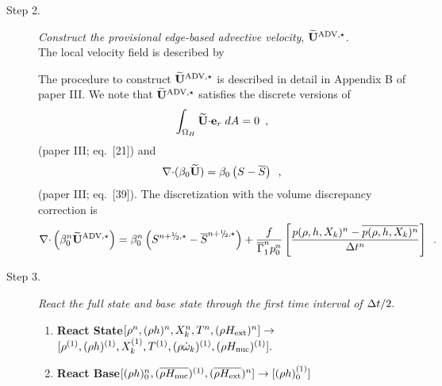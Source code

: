 \begin{description}
\item[Step 2.] {\em Construct the provisional edge-based advective velocity}, $\widetilde{\mathbf{U}}^{\mathrm{ADV},\star}$.\\

The local velocity field is described by

The procedure to construct $\widetilde{\mathbf{U}}^{\mathrm{ADV},\star}$ is described in detail in Appendix B of paper III.
We note that  $\widetilde{\mathbf{U}}^{\mathrm{ADV},\star}$ satisfies the discrete versions of 
\begin{equation}
\int_{\Omega_H} \widetilde{{\bf U}} \mathbf{\cdot} \mathbf{e}_r \; dA = 0 \label{eq:udoterzero} \enskip ,
\end{equation}
(paper III; eq.~[21])
and
\begin{equation}
\mathbf{\nabla} \mathbf{\cdot} (\beta_0 \widetilde{{\bf U}} )  = \beta_0 \left(S - \overline{S} \right )\enskip ,
\label{eq:tildeconstraint}
\end{equation}
(paper III; eq.~[39]).  The discretization with the volume discrepancy correction is
\begin{equation}
\nablab \cdotb \left(\beta_0^n \uadvone\right) = 
\beta_0^n \left(S^{\nph,\star} - \overline{S}^{\nph,\star}\right)
+ \frac{f}{\gammabar^n p_0^n}
\left[\frac{p(\rho,h,X_k)^n - \overline{p(\rho,h,X_k)^n}}{\Delta t^n}\right] \enskip .
\end{equation}

\item[Step 3.] {\em React the full state and base state through the first time 
interval of $\Delta t / 2.$}


\begin{enumerate}
\renewcommand{\theenumi}{{\bf \alph{enumi}}}

\item {\bf React State}$[\rho^n, (\rho h)^n, X_k^n, T^n, (\rho{H_{\rm ext}})^n]
                   \rightarrow$ $[ \rho^{(1)}, (\rho h)^{(1)}, X_k^{(1)}, T^{(1)},
                                  (\rho \dot{\omega}_k)^{(1)}, (\rho {H_{\rm nuc}})^{(1)} ].$  

\item {\bf React Base}$[(\rho h)_0^n,(\overline{\rho {H_{\rm nuc}}})^{(1)},(\overline{\rho{H_{\rm ext}}})^n] \rightarrow [(\rho h)_0^{(1)}]$


\end{enumerate}
\end{description}
